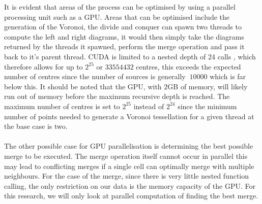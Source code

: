 It is evident that areas of the process can be optimised by using a parallel processing unit such as a GPU. Areas that can be optimised include the generation of the Voronoi, the divide and conquer can spawn two threads to compute the left and right diagrams, it would then simply take the diagrams returned by the threads it spawned, perform the merge operation and pass it back to it's parent thread. CUDA is limited to a nested depth of 24 calls \citep{CUDA}, which therefore allows for up to $2^{25}$ or $33554432$ centres, this exceeds the expected number of centres since the number of sources is generally $~10000$ which is far below this. It should be noted that the GPU, with $2$GB of memory, will likely run out of memory before the maximum recursive depth is reached. The maximum number of centres is set to $2^{25}$ instead of $2^{24}$ since the minimum number of points needed to generate a Voronoi tessellation for a given thread at the base case is two.
\\
\\
The other possible case for GPU parallelisation is determining the best possible merge to be executed. The merge operation itself cannot occur in parallel this may lead to conflicting merges if a single cell can optimally merge with multiple neighbours. For the case of the merge, since there is very little nested function calling, the only restriction on our data is the memory capacity of the GPU. For this research, we will only look at parallel computation of finding the best merge.
